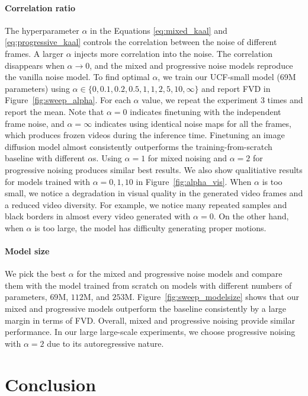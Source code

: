 \documentclass[10pt,twocolumn,letterpaper]{article}
\newcommand{\new}[1]{#1}
\begin{document}
\paragraph{Correlation ratio} The hyperparameter $\alpha$ in the Equations \ref{eq:mixed_kaal} and \ref{eq:progressive_kaal} controls the correlation between the noise of different frames. A larger $\alpha$ injects more correlation into the noise. The correlation disappears when $\alpha \rightarrow 0$, and the mixed and progressive noise models reproduce the vanilla noise model. 
To find optimal $\alpha$, we train our UCF-small model ($69$M parameters) using $\alpha \in \{0, 0.1, 0.2, 0.5, 1, 1, 2, 5, 10, \infty\}$ and report FVD in Figure~\ref{fig:sweep_alpha}. 
For each $\alpha$ value, we repeat the experiment 3 times and report the mean. Note that $\alpha=0$ indicates finetuning with the independent frame noise, and $\alpha=\infty$ indicates using identical noise maps for all the frames, which produces frozen videos during the inference time. Finetuning an image diffusion model almost consistently outperforms the training-from-scratch baseline with different $\alpha$s. Using $\alpha=1$ for mixed noising and $\alpha=2$ for progressive noising produces similar best results. \new{We also show qualitiative results for models trained with $\alpha=0, 1, 10$ in Figure~\ref{fig:alpha_vis}. When $\alpha$ is too small, we notice a degradation in visual quality in the generated video frames and a reduced video diversity. For example, we notice many repeated samples and black borders in almost every video generated with $\alpha=0$. On the other hand, when $\alpha$ is too large, the model has difficulty generating proper motions.}


\paragraph{Model size} 
We pick the best $\alpha$ for the mixed and progressive noise models and compare them with the model trained from scratch on models with different numbers of parameters, $69$M, $112$M, and $253$M.
Figure~\ref{fig:sweep_modelsize} shows that our mixed and progressive models outperform the baseline consistently by a large margin in terms of FVD.
Overall, mixed and progressive noising provide similar performance. 
In our large large-scale experiments, we choose progressive noising with $\alpha=2$ due to its autoregressive nature.
 
\section{Conclusion}\label{sec:conclusion}
\end{document}
